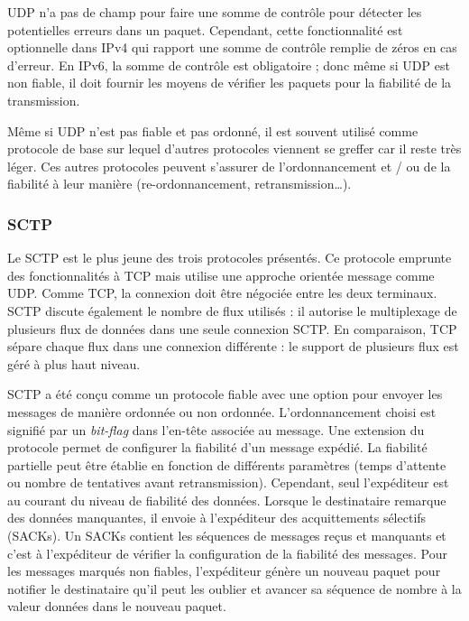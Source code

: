 \gls{UDP} n'a pas de champ pour faire une somme de contrôle pour détecter les 
potentielles erreurs dans un paquet. Cependant, cette fonctionnalité est optionnelle 
dans IPv4 qui rapport une somme de contrôle remplie de zéros en cas d'erreur. En 
IPv6, la somme de contrôle est obligatoire ; donc même si \gls{UDP} est non fiable, 
il doit fournir les moyens de vérifier les paquets pour la fiabilité de 
la transmission.

Même si \gls{UDP} n'est pas fiable et pas ordonné, il est souvent utilisé comme 
protocole de base sur lequel d'autres protocoles viennent se greffer car il reste très 
léger. Ces autres protocoles peuvent s'assurer de l'ordonnancement et / ou de la 
fiabilité à leur manière (re-ordonnancement, retransmission\dots). 

\subsubsection{SCTP}
Le \gls{SCTP} est le plus jeune des trois protocoles présentés. Ce protocole 
emprunte des fonctionnalités à \gls{TCP} mais utilise une approche orientée 
message comme \gls{UDP}. Comme \gls{TCP}, la connexion doit être négociée 
entre les deux terminaux. \gls{SCTP} discute également le nombre de flux utilisés 
: il autorise le multiplexage de plusieurs flux de données dans une seule 
connexion \gls{SCTP}. En comparaison, \gls{TCP} sépare chaque flux dans une 
connexion différente : le support de plusieurs flux est géré à plus haut niveau.

\gls{SCTP} a été conçu comme un protocole fiable avec une option pour envoyer 
les messages de manière ordonnée ou non ordonnée. L'ordonnancement choisi est 
signifié par un \textit{bit-flag} dans l'en-tête associée au message. Une extension 
du protocole permet de configurer la fiabilité d'un message expédié. La fiabilité 
partielle peut être établie en fonction de différents paramètres (temps d'attente ou 
nombre de tentatives 
avant retransmission). Cependant, seul l'expéditeur est au courant du niveau de 
fiabilité des données. Lorsque le destinataire remarque des données manquantes, 
il envoie à l'expéditeur des acquittements sélectifs (SACKs). Un SACKs contient 
les séquences de messages reçus et manquants et c'est à l'expéditeur de vérifier 
la configuration de la fiabilité des messages. Pour les messages marqués non 
fiables, l'expéditeur génère un nouveau paquet pour notifier le destinataire qu'il 
peut les \og oublier\fg{} et avancer sa séquence de nombre à la valeur données 
dans le nouveau paquet. 

